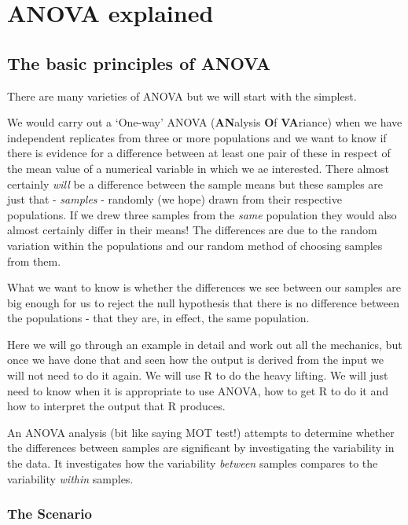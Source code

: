\documentclass[
  letterpaper,
  DIV=11,
  numbers=noendperiod]{scrreprt}
\begin{document}
\chapter{ANOVA explained}\label{anova-explained}

\section{The basic principles of
ANOVA}\label{the-basic-principles-of-anova}

There are many varieties of ANOVA but we will start with the simplest.

We would carry out a `One-way' ANOVA (\textbf{AN}alysis \textbf{O}f
\textbf{VA}riance) when we have independent replicates from three or
more populations and we want to know if there is evidence for a
difference between at least one pair of these in respect of the mean
value of a numerical variable in which we ae interested. There almost
certainly \emph{will} be a difference between the sample means but these
samples are just that - \emph{samples} - randomly (we hope) drawn from
their respective populations. If we drew three samples from the
\emph{same} population they would also almost certainly differ in their
means! The differences are due to the random variation within the
populations and our random method of choosing samples from them.

What we want to know is whether the differences we see between our
samples are big enough for us to reject the null hypothesis that there
is no difference between the populations - that they are, in effect, the
same population.

Here we will go through an example in detail and work out all the
mechanics, but once we have done that and seen how the output is derived
from the input we will not need to do it again. We will use R to do the
heavy lifting. We will just need to know when it is appropriate to use
ANOVA, how to get R to do it and how to interpret the output that R
produces.

An ANOVA analysis (bit like saying MOT test!) attempts to determine
whether the differences between samples are significant by investigating
the variability in the data. It investigates how the variability
\emph{between} samples compares to the variability \emph{within}
samples.

\subsection{The Scenario}\label{the-scenario}
\end{document}
